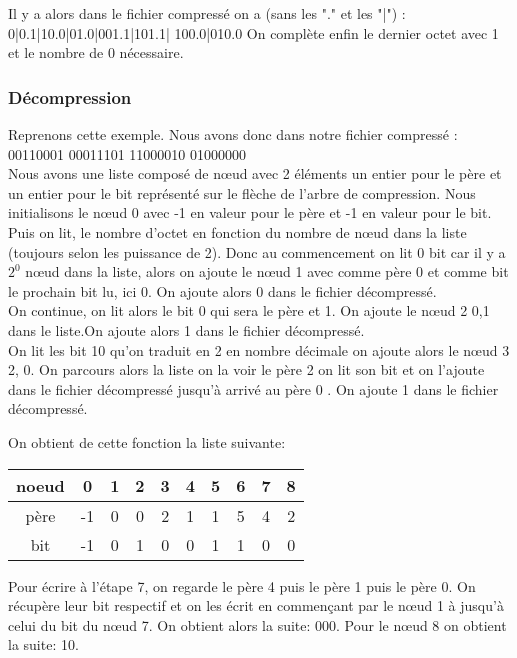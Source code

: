 \documentclass{report}
\begin{document}
Il y a alors dans le fichier compressé on a (sans les "." et les "|") :\\ 
0|0.1|10.0|01.0|001.1|101.1| 100.0|010.0 
On complète enfin le dernier octet avec 1 et le nombre de 0 nécessaire. 

\subsubsection{Décompression}
Reprenons cette exemple. 
Nous avons donc dans notre fichier compressé :
00110001 00011101 11000010 01000000 \\
Nous avons une liste composé de nœud avec 2 éléments un entier pour le père et un entier pour le bit représenté sur le flèche de l'arbre de compression. Nous initialisons le nœud 0 avec -1 en valeur pour le père et -1 en valeur pour le bit. 
Puis on lit, le nombre d'octet en fonction du nombre de nœud dans la liste (toujours selon les puissance de 2).
Donc au commencement on lit 0 bit car il y a $2^{0}$ nœud dans la liste, alors on ajoute le nœud 1 avec comme père 0 et comme bit le prochain bit lu, ici 0.
On ajoute alors 0 dans le fichier décompressé. \\
On continue, on lit alors le bit 0 qui sera le père et 1. On ajoute le nœud 2 {0,1} 
dans le liste.On ajoute alors 1 dans le fichier décompressé.\\
On lit les bit 10 qu'on traduit en 2 en nombre décimale on ajoute alors le nœud 3 {2, 0}. On parcours alors la liste on la voir le père 2 on lit son bit et on l'ajoute dans le fichier décompressé jusqu'à arrivé au père 0 . On ajoute 1 dans le fichier décompressé. 

On obtient de cette fonction la liste suivante:
\begin{center}
\begin{tabular}{|c|c|c|c|c|c|c|c|c|c|}
\hline
noeud & 0 & 1 & 2 & 3 & 4 & 5 & 6 & 7 & 8 \\
\hline
père & -1 & 0 & 0 & 2 & 1 & 1 & 5 & 4 & 2\\
\hline
bit & -1 & 0 & 1 & 0 & 0 & 1 & 1 & 0 & 0 \\
\hline 
\end{tabular}
\end{center}
 
Pour écrire à l'étape 7, on regarde le père 4 puis le père 1 puis le père 0. 
On récupère leur bit respectif et on les écrit en commençant par le nœud  1 à jusqu'à celui du bit du nœud 7. On obtient alors la suite: 000.
Pour le nœud 8 on obtient la suite: 10. 
\end{document}
